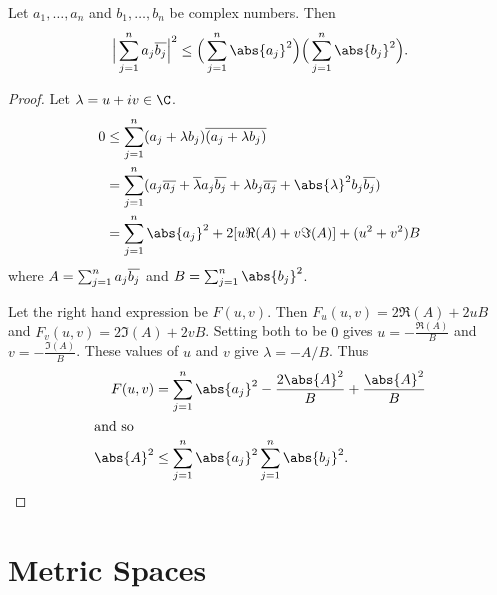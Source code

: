 \begin{theorem} \label{thm:C:cs}
    Let $a_1, \dots, a_n$ and $b_1, \dots, b_n$ be complex numbers.
    Then \[
        \Big\lvert\sum_{j=1}^n a_j \conj{b_j}\Big\rvert^2
            \le \Big(\sum_{j=1}^n \abs{a_j}^2\Big)
              \Big(\sum_{j=1}^n \abs{b_j}^2\Big).
    \]
\end{theorem}
\begin{proof}
    Let $\lambda = u + iv \in \C$.
    \begin{align*}
        0 &\le \sum_{j=1}^n (a_j + \lambda b_j)\conj{(a_j + \lambda b_j)} \\
          &= \sum_{j=1}^n (a_j \conj{a_j} + \conj{\lambda} a_j \conj{b_j}
            + \lambda b_j \conj{a_j} + \abs{\lambda}^2 b_j \conj{b_j}) \\
          &= \sum_{j=1}^n \abs{a_j}^2 + 2[u \Re(A) + v \Im(A)]
            + (u^2 + v^2) B
    \end{align*}
    where $A = \sum_{j=1}^n a_j \overline{b_j}$ and
    $B = \sum_{j=1}^n \abs{b_j}^2$.

    Let the right hand expression be $F(u, v)$.
    Then $F_u(u, v) = 2\Re(A) + 2uB$ and $F_v(u, v) = 2\Im(A) + 2vB$.
    Setting both to be $0$ gives $u = -\frac{\Re(A)}{B}$ and
    $v = -\frac{\Im(A)}{B}$.
    These values of $u$ and $v$ give $\lambda = -A/B$.
    Thus \begin{align*}
        F(u, v) &= \sum_{j=1}^n \abs{a_j}^2 - \frac{2 \abs{A}^2}{B}
                    + \frac{\abs{A}^2}{B} \\
        \shortintertext{and so}
        \abs{A}^2 &\le \sum_{j=1}^n \abs{a_j}^2 \sum_{j=1}^n \abs{b_j}^2.
            \qedhere
    \end{align*}
\end{proof}

\chapter{Metric Spaces} \label{chp:metric}
